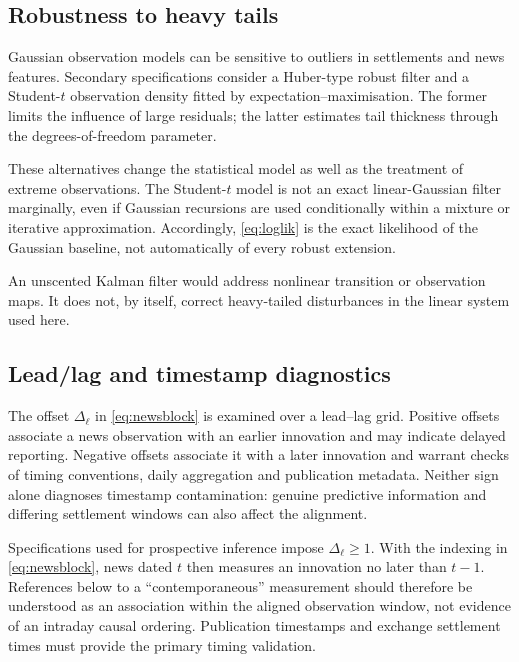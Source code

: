 \documentclass[journal]{IEEEtran}
\begin{document}
\subsection{Robustness to heavy tails}
\label{sec:robust}

Gaussian observation models can be sensitive to outliers in settlements and news features. Secondary specifications consider a Huber-type robust filter and a Student-$t$ observation density fitted by expectation--maximisation. The former limits the influence of large residuals; the latter estimates tail thickness through the degrees-of-freedom parameter.

These alternatives change the statistical model as well as the treatment of extreme observations. The Student-$t$ model is not an exact linear-Gaussian filter marginally, even if Gaussian recursions are used conditionally within a mixture or iterative approximation. Accordingly, \eqref{eq:loglik} is the exact likelihood of the Gaussian baseline, not automatically of every robust extension.

An unscented Kalman filter would address nonlinear transition or observation maps. It does not, by itself, correct heavy-tailed disturbances in the linear system used here.

\subsection{Lead/lag and timestamp diagnostics}
\label{sec:leadlag}

The offset $\Delta_\ell$ in \eqref{eq:newsblock} is examined over a lead--lag grid. Positive offsets associate a news observation with an earlier innovation and may indicate delayed reporting. Negative offsets associate it with a later innovation and warrant checks of timing conventions, daily aggregation and publication metadata. Neither sign alone diagnoses timestamp contamination: genuine predictive information and differing settlement windows can also affect the alignment.

Specifications used for prospective inference impose $\Delta_\ell\geq1$. With the indexing in \eqref{eq:newsblock}, news dated $t$ then measures an innovation no later than $t-1$. References below to a ``contemporaneous'' measurement should therefore be understood as an association within the aligned observation window, not evidence of an intraday causal ordering. Publication timestamps and exchange settlement times must provide the primary timing validation.
\end{document}

